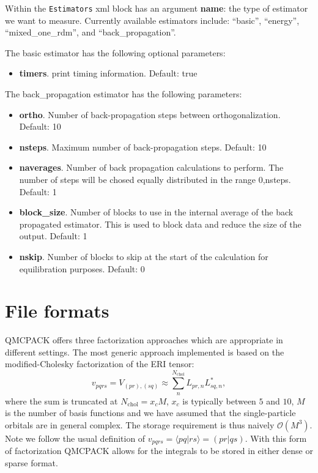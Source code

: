 Within the \texttt{Estimators} xml block has an argument \textbf{name}: the type of estimator we want to measure. Currently available estimators include: ``basic'', ``energy'', ``mixed\_one\_rdm'', and ``back\_propagation''.  

The basic estimator has the following optional parameters:
\begin{itemize}
\item \textbf{timers}. print timing information. Default: true
\end{itemize}

The back\_propagation estimator has the following parameters:
\begin{itemize}
\item \textbf{ortho}. Number of back-propagation steps between orthogonalization. 
    Default: 10
\item \textbf{nsteps}. Maximum number of back-propagation steps. 
    Default: 10
\item \textbf{naverages}. Number of back propagation calculations to perform. The number of steps will be chosed equally distributed in the range {0,nsteps}. 
    Default: 1
\item \textbf{block\_size}. Number of blocks to use in the internal average of the back propagated estimator. This is used to block data and reduce the size of the output. 
    Default: 1 
\item \textbf{nskip}. Number of blocks to skip at the start of the calculation for equilibration purposes. 
    Default: 0
\end{itemize}

\section{File formats}
QMCPACK offers three factorization approaches which are appropriate in different settings. The most generic approach implemented
is based on the modified-Cholesky
factorization\cite{BeebeCholesky1977,KochCholesky2003,AquilanteMOLCAS2009,PurwantoCa2011,PurwantoDownfolding2013} of the ERI
tensor:
\begin{equation}
    v_{pqrs} = V_{(pr),(sq)} \approx \sum_n^{N_\mathrm{chol}} L_{pr,n} L^{*}_{sq,n},
\end{equation}
where the sum is truncated at $N_{\mathrm{chol}} = x_c M$, $x_c$ is typically between $5$ and $10$, $M$ is the number of basis
functions and we have assumed that the single-particle orbitals are in general complex.
The storage requirement is thus naively $\mathcal{O}(M^3)$.
Note we follow the usual definition of $v_{pqrs} = \langle pq | rs \rangle = (pr|qs)$.
With this form of factorization QMCPACK allows for the integrals to be stored in either dense or sparse format.

